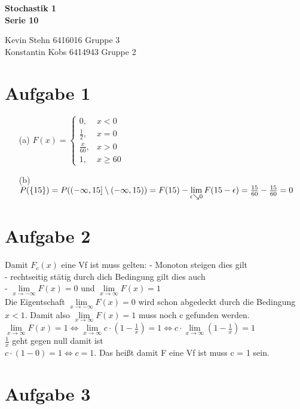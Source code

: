 \documentclass[10pt,a4paper]{article}
\begin{document}
\begin{center}
\textbf{Stochastik 1 \\ Serie 10 \\}
\end{center}

\begin{flushright}
Kevin Stehn 6416016 Gruppe 3 \\
Konstantin Kobs 6414943 Gruppe 2
\end{flushright}

\section*{Aufgabe 1}
\begin{itemize}
\item[(a)]
$ F(x)=\left\{\begin{array}{cl} 0, & x < 0\\ 
\frac{1}{2}, & x = 0 \\ 
\frac{x}{60}, & x > 0 \\
1 , & x \geq 60 \end{array}\right.$
\item[(b)]$P(\{15\}) = P((-\infty,15] \setminus (-\infty,15)) \\
= F(15) - \lim\limits_{\epsilon \searrow 0 }{F(15-\epsilon)}\\
= \frac{15}{60} - \frac{15}{60} = 0$
\end{itemize}

\section*{Aufgabe 2}
Damit $F_c(x)$ eine Vf ist muss gelten: - Monoton steigen dies gilt \\
- rechtseitig stätig durch dich Bedingung gilt dies auch\\
- $\lim\limits_{x \rightarrow -\infty }{F(x)} = 0$ und $\lim\limits_{x \rightarrow \infty }{F(x)} = 1$ \\
Die Eigentschaft $\lim\limits_{x \rightarrow -\infty }{F(x)} = 0$ wird schon abgedeckt durch die Bedingung $x < 1$. Damit also $\lim\limits_{x \rightarrow \infty }{F(x)} = 1$ muss noch c gefunden werden.\\
$\lim\limits_{x \rightarrow \infty }{F(x)} = 1 \Leftrightarrow \lim\limits_{x \rightarrow \infty }{c \cdot(1-\frac{1}{x})} = 1 \Leftrightarrow c \cdot \lim\limits_{x \rightarrow \infty }{ (1-\frac{1}{x})} = 1$ \\
$\frac{1}{x} $ geht gegen null damit ist\\
$c \cdot (1-0) = 1 \Leftrightarrow c = 1$.
Das heißt damit F eine Vf ist muss c = 1 sein.
\section*{Aufgabe 3}
\end{document}
